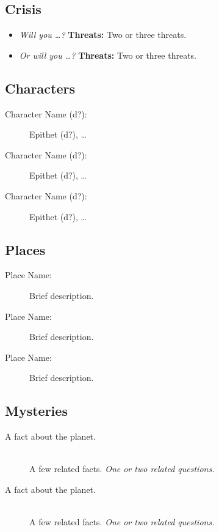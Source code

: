 \documentclass[11pt, a5paper, parskip=half-, DIV=12]{scrartcl}
\begin{document}
\subsection*{Crisis}

\begin{itemize}
	\item \textit{Will you \ldots?} \textbf{Threats:} Two or three threats.
	\item \textit{Or will you \ldots?} \textbf{Threats:} Two or three threats.
\end{itemize}

\newpage

\subsection*{Characters}
\begin{description}
	\item[Character Name (d?):] Epithet (d?), \ldots
	\item[Character Name (d?):] Epithet (d?), \ldots
	\item[Character Name (d?):] Epithet (d?), \ldots
\end{description}

\subsection*{Places}
\begin{description}
	\item[Place Name:] Brief description.
	\item[Place Name:] Brief description.
	\item[Place Name:] Brief description.
\end{description}

\subsection*{Mysteries}
\begin{description}
	\item[A fact about the planet.] \phantom{a} \\ A few related facts. \textit{One or two related questions.}
	\item[A fact about the planet.] \phantom{a} \\ A few related facts. \textit{One or two related questions.}
\end{description}

\newpage


\end{document}
